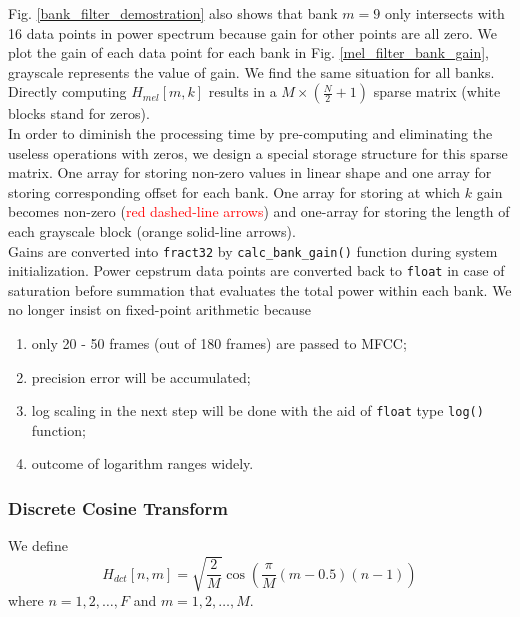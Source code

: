 Fig. \ref{bank_filter_demostration} also shows that bank $m=9$ only intersects with 16 data points in power spectrum because gain for other points are all zero. We plot the gain of each data point for each bank in Fig. \ref{mel_filter_bank_gain}, grayscale represents the value of gain. We find the same situation for all banks. Directly computing $H_{mel}[m, k]$ results in a $M \times \left( \frac{N}{2} + 1 \right)$ sparse matrix (white blocks stand for zeros).\\

In order to diminish the processing time by pre-computing and eliminating the useless operations with zeros, we design a special storage structure for this sparse matrix. One array for storing non-zero values in linear shape and one array for storing corresponding offset for each bank. One array for storing at which $k$ gain becomes non-zero (\textcolor{red}{red dashed-line arrows}) and one-array for storing the length of each grayscale block (\textcolor{orange_html}{orange solid-line arrows}).\\

Gains are converted into \texttt{fract32} by \texttt{calc\_bank\_gain()} function during system initialization. Power cepstrum data points are converted back to \texttt{float} in case of saturation before summation that evaluates the total power within each bank. We no longer insist on fixed-point arithmetic because
\begin{enumerate}
\item only 20 - 50 frames (out of 180 frames) are passed to MFCC;
\item precision error will be accumulated;
\item log scaling in the next step will be done with the aid of \texttt{float} type \texttt{log()} function;
\item outcome of logarithm ranges widely.
\end{enumerate}


\subsubsection{Discrete Cosine Transform}

We define
\begin{equation}
\label{eq:dct-coef}
H_{dct}[n, m] = \sqrt{\frac{2}{M}} \cos \left( \frac{\pi}{M} (m - 0.5) (n-1) \right)
\end{equation}
where $n = 1, 2, \dots, F$ and $m = 1, 2, \dots, M$.\\

